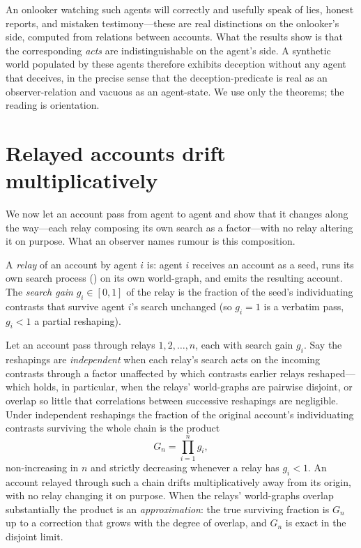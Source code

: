 \documentclass[11pt,twocolumn,a4paper]{article}
\begin{document}
\begin{remark}
\label{rem:deception}
An onlooker watching such agents will correctly and usefully speak of lies,
honest reports, and mistaken testimony---these are real distinctions on the
onlooker's side, computed from relations between accounts. What the results
show is that the corresponding \emph{acts} are indistinguishable on the
agent's side. A synthetic world populated by these agents therefore exhibits
deception without any agent that deceives, in the precise sense that the
deception-predicate is real as an observer-relation and vacuous as an
agent-state. We use only the theorems; the reading is orientation.
\end{remark}

\section{Relayed accounts drift multiplicatively}
\label{sec:drift}

We now let an account pass from agent to agent and show that it changes
along the way---each relay composing its own search as a factor---with no
relay altering it on purpose. What an observer names rumour is this
composition.

\begin{definition}
\label{def:relay}
A \emph{relay} of an account by agent $i$ is: agent $i$ receives an account
as a seed, runs its own search process () on its own
world-graph, and emits the resulting account. The \emph{search gain}
$g_i\in[0,1]$ of the relay is the fraction of the seed's individuating
contrasts that survive agent $i$'s search unchanged (so $g_i=1$ is a
verbatim pass, $g_i<1$ a partial reshaping).
\end{definition}

\begin{theorem}
\label{thm:drift}
Let an account pass through relays $1,2,\dots,n$, each with search gain
$g_i$. Say the reshapings are \emph{independent} when each relay's search
acts on the incoming contrasts through a factor unaffected by which
contrasts earlier relays reshaped---which holds, in particular, when the
relays' world-graphs are pairwise disjoint, or overlap so little that
correlations between successive reshapings are negligible. Under independent
reshapings the fraction of the original account's individuating contrasts
surviving the whole chain is the product
\[
G_n=\prod_{i=1}^{n}g_i,
\]
non-increasing in $n$ and strictly decreasing whenever a relay has $g_i<1$.
An account relayed through such a chain drifts multiplicatively away from its
origin, with no relay changing it on purpose. When the relays' world-graphs
overlap substantially the product is an \emph{approximation}: the true
surviving fraction is $G_n$ up to a correction that grows with the degree of
overlap, and $G_n$ is exact in the disjoint limit.
\end{theorem}
\end{document}
